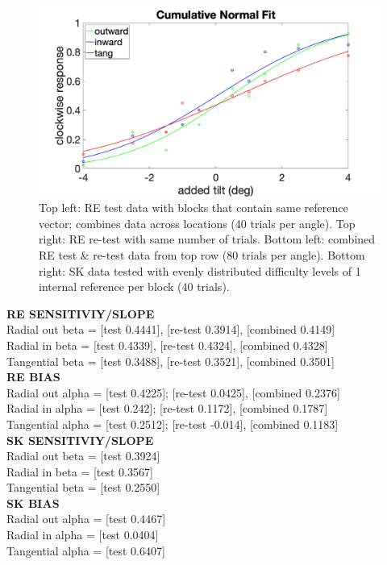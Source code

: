 \documentclass[11pt]{article} %
\begin{document}
\begin{figure}[H]
\includegraphics[scale=.16]{Images/PF_SK.png}
\caption{Top left: RE test data with blocks that contain same reference vector; combines data across locations (40 trials per angle). Top right: RE re-test with same number of trials. Bottom left: combined RE test \& re-test data from top row (80 trials per angle). Bottom right: SK data tested with evenly distributed difficulty levels of 1 internal reference per block (40 trials).}
\end{figure}

\textbf{RE SENSITIVIY/SLOPE}
\\
Radial out beta = [test 0.4441], [re-test 0.3914], [combined 0.4149]
\\
Radial in beta = [test 0.4339], [re-test 0.4324], [combined 0.4328]
\\
Tangential beta = [test 0.3488], [re-test 0.3521], [combined 0.3501]
\\
\textbf{RE BIAS}
\\
Radial out alpha = [test 0.4225]; [re-test 0.0425], [combined 0.2376]
\\
Radial in alpha = [test 0.242]; [re-test 0.1172], [combined 0.1787]
\\
Tangential alpha = [test 0.2512]; [re-test -0.014], [combined 0.1183]
\\
\textbf{SK SENSITIVIY/SLOPE}
\\
Radial out beta = [test 0.3924]
\\
Radial in beta = [test 0.3567]
\\
Tangential beta = [test 0.2550]
\\
\textbf{SK BIAS}
\\
Radial out alpha = [test 0.4467]
\\
Radial in alpha = [test 0.0404]
\\
Tangential alpha = [test 0.6407]
\end{document}
